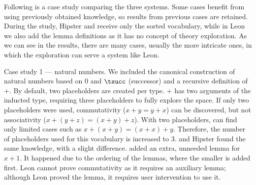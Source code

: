 Following is a case study comparing the three systems. 
Some cases benefit from using previously obtained knowledge, so results from previous cases are retained.
During the study, Hipster and \TheSy receive only the sorted vocabulary, while in Leon we also add the lemma definitions as it has no concept of theory exploration.
As we can see in the results, there are many cases, usually the more intricate ones, in which the exploration can serve a system like Leon.

\begin{table}
\centering
\resizebox{0.98\textwidth}{!}{%

}

\vspace{2pt}
\caption{Results of the case study comparing \TheSy, Hipster, and Leon}
\label{eval:case-study}
\end{table}

\begin{myparagraph}{Case study 1 --- natural numbers.}
We included the canonical construction of natural numbers based on $0$ and $\tsucc$ (successor) and a recursive definition of $+$.
By default, two placeholders are created per type. $+$ has two arguments of the inducted type, requiring three placeholders to fully explore the space.
If only two placeholders were used, commutativity ($x+y=y+x$) can be discovered, but not associativity ($x + (y + z) = (x + y) + z$). With two placeholders, \TheSy can find only limited cases such as $x + (x + y) = (x + x) + y$.
Therefore, the number of placeholders used for this vocabulary is increased to $3$.
\TheSy and Hipster found the same knowledge, with a slight difference.
\TheSy added an extra, unneeded lemma for $x+1$.
It happened due to the ordering of the lemmas, where the smaller is added first.
Leon cannot prove commutativity as it requires an auxiliary lemma; although Leon proved the lemma, it requires user intervention to use it.
\end{myparagraph}

